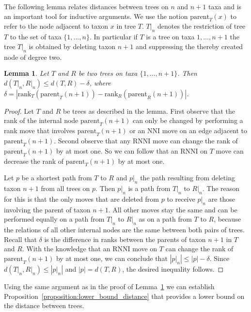 \documentclass{amsart}
\newcommand{\parent}{\mathrm{parent}}
\newcommand{\rank}{\mathrm{rank}}
\newcommand{\nni}{\mathrm{NNI}}
\newcommand{\rnni}{\mathrm{RNNI}}
\newtheorem{lemma}[definition]{Lemma}
\begin{document}
The following lemma relates distances between trees on $n$ and $n+1$ taxa and is an important tool for inductive arguments.
We use the notion $\parent_T(x)$ to refer to the node adjacent to taxon $x$ in tree $T$.
$T{\big|}_n$ denotes the restriction of tree $T$ to the set of taxa $\{1, \ldots, n\}$.
In particular if $T$ is a tree on taxa $1, \ldots, n+1$ the tree $T{\big|}_n$ is obtained by deleting taxon $n+1$ and suppressing the thereby created node of degree two.

\begin{lemma}
Let $T$ and $R$ be two trees on taxa $\{1, \ldots, n+1\}$.
Then $d(T{\big|}_n, R{\big|}_n) \leq d(T,R) - \delta$, where $\delta = |\rank_T(\parent_T(n+1)) - \rank_R(\parent_R(n+1))|$.
\label{lemma:distance_delete_taxon}
\end{lemma}

\begin{proof}
Let $T$ and $R$ be trees as described in the lemma.
First observe that the rank of the internal node $\parent_T(n+1)$ can only be changed by performing a rank move that involves $\parent_T(n+1)$ or an $\nni$ move on an edge adjacent to $\parent_T(n+1)$.
Second observe that any $\rnni$ move can change the rank of $\parent_T(n+1)$ by at most one.
So we can follow that an $\rnni$ on $T$ move can decrease the rank of $\parent_T(n+1)$ by at most one.

Let $p$ be a shortest path from $T$ to $R$ and $p{\big|}_n$ the path resulting from deleting taxon $n+1$ from all trees on $p$.
Then $p{\big|}_n$ is a path from $T{\big|}_n$ to $R{\big|}_n$.
The reason for this is that the only moves that are deleted from $p$ to receive $p{\big|}_n$ are those involving the parent of taxon $n+1$.
All other moves stay the same and can be performed equally on a path from $T{\big|}_n$ to $R{\big|}_n$ as on a path from $T$ to $R$, because the relations of all other internal nodes are the same between both pairs of trees.
Recall that $\delta$ is the difference in ranks between the parents of taxon $n+1$ in $T$ and $R$.
With the knowledge that an $\rnni$ move on $T$ can change the rank of $\parent_T(n+1)$ by at most one, we can conclude that $|p{\big|}_n| \leq |p| - \delta$.
Since $d(T{\big|}_n,R{\big|}_n) \leq |p{\big|}_n|$ and $|p| = d(T,R)$, the desired inequality follows.
\end{proof}


Using the same argument as in the proof of Lemma~\ref{lemma:distance_delete_taxon} we can establish Proposition~\ref{proposition:lower_bound_distance} that provides a lower bound on the distance between trees.
\end{document}
